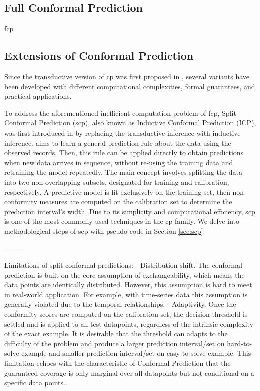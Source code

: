 \documentclass[a4paper,oneside,bibliography=totoc]{scrbook}
\begin{document}
\subsection{Full Conformal Prediction}
\gls{fcp}


\subsection{Extensions of Conformal Prediction}
Since the transductive version of \gls{cp} was first proposed in \cite{gammerman1998learning}, several variants have been developed with different computational complexities, formal guarantees, and practical applications.

To address the aforementioned inefficient computation problem of \gls{fcp}, Split Conformal Prediction (\gls{scp}), also known as Inductive Conformal Prediction (ICP), was first introduced in \cite{papadopoulos2002inductive} by replacing the transductive inference with inductive inference.  aims to learn a general prediction rule about the data using the observed records. Then, this rule can be applied directly to obtain predictions when new data arrives in sequence, without re-using the training data and retraining the model repeatedly. The main concept involves splitting the data into two non-overlapping subsets, designated for training and calibration, respectively. A predictive model is fit exclusively on the training set, then non-conformity measures are computed on the calibration set to determine the prediction interval's width. Due to its simplicity and computational efficiency, \gls{scp} is one of the most commonly used techniques in the \gls{cp} family. We delve into methodological steps of \gls{scp} with pseudo-code in Section \ref{sec:scp}.

--------

Limitations of split conformal predictions:
- Distribution shift. The conformal prediction is built on the core assumption of exchangeability, which means the data points are identically distributed. However, this assumption is hard to meet in real-world application. For example, with time-series data this assumption is generally violated due to the temporal relationships. 
- Adaptivity. Once the conformity scores are computed on the calibration set, the decision threshold is settled and is applied to all test datapoints, regardless of the intrinsic complexity of the exact example. It is desirable that the threshold can adapts to the difficulty of the problem and produce a larger prediction interval/set on hard-to-solve example and smaller prediction interval/set on easy-to-solve example. This limitation echoes with the characteristic of Conformal Prediction that the guaranteed coverage is only marginal over all datapoints but not conditional on a specific data points..
\end{document}
